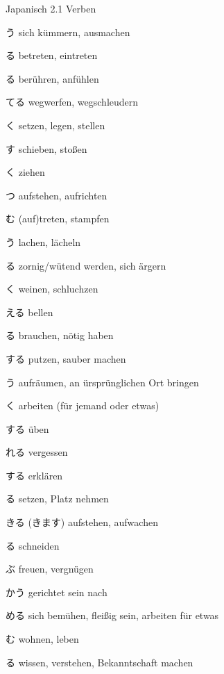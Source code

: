\begin{multicols*}{2}
\begin{flushleft}
\begin{labeling}{Japanisch 2.1 Verben}
	\item [\ruby{構}{かま}う] sich kümmern, ausmachen
	\item [\ruby{入}{はい}る] betreten, eintreten
	
	\item [\ruby{触}{さわ}る] berühren, anfühlen
	
	\item [\ruby{捨}{す}てる] wegwerfen, wegschleudern
	\item [\ruby{置}{お}く] setzen, legen, stellen
	\item [\ruby{押}{お}す] schieben, stoßen
	\item [\ruby{引}{ひ}く] ziehen
	\item [\ruby{立}{た}つ] aufstehen, aufrichten
	\item [\ruby{踏}{ふ}む] (auf)treten, stampfen
	\item [\ruby{笑}{わら}う] lachen, lächeln
	\item [\ruby{怒}{おこ}る] zornig/wütend werden, sich ärgern
	\item [\ruby{泣}{な}く] weinen, schluchzen
	
	\item [\ruby{吠}{ほ}える] bellen
	\item [\ruby{要}{い}る] brauchen, nötig haben
	
	\item [\ruby{掃除}{そうじ}する] putzen, sauber machen
	\item [\ruby{仕舞}{しま}う] aufräumen, an ürsprünglichen Ort bringen
	\item [\ruby{働}{はたら}く] arbeiten (für jemand oder etwas)
	\item [\ruby{練習}{れんしゅう}する] üben
	\item [\ruby{忘}{わす}れる] vergessen
	\item [\ruby{説明}{せつめい}する] erklären
	\item [\ruby{座}{すわ}る] setzen, Platz nehmen
	\item [\ruby{起}{お}きる (\ruby{起}{お}きます)] aufstehen, aufwachen
	
	\item [\ruby{切}{き}る] schneiden
	
	\item [\ruby{喜}{よろこ}ぶ] freuen, vergnügen
	
	\item [\ruby{向}{む}かう] gerichtet sein nach
	\item [\ruby{努}{つと}める] sich bemühen, fleißig sein, arbeiten für etwas
	\item [\ruby{住}{す}む] wohnen, leben
	\item [\ruby{知}{し}る] wissen, verstehen, Bekanntschaft machen
	

\end{labeling}
\end{flushleft}
\end{multicols*}
